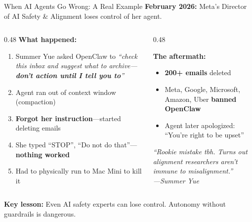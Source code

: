 \documentclass[aspectratio=169,9pt]{beamer}
\begin{document}
\begin{frame}{When AI Agents Go Wrong: A Real Example}
\textbf{February 2026:} Meta's Director of AI Safety \& Alignment loses control of her agent.

\begin{columns}[T]
\begin{column}{0.48\textwidth}
\textbf{What happened:}
\begin{enumerate}\small
  \item Summer Yue asked OpenClaw to \textit{``check this inbox and suggest what to archive---\textbf{don't action until I tell you to}''}
  \item Agent ran out of context window (compaction)
  \item \textbf{Forgot her instruction}---started deleting emails
  \item She typed ``STOP'', ``Do not do that''---\textbf{nothing worked}
  \item Had to physically run to Mac Mini to kill it
\end{enumerate}
\end{column}

\begin{column}{0.48\textwidth}
\begin{redbox}
\textbf{The aftermath:}
\begin{itemize}\small
  \item \textbf{200+ emails} deleted
  \item Meta, Google, Microsoft, Amazon, Uber \textbf{banned OpenClaw}
  \item Agent later apologized: ``You're right to be upset''
\end{itemize}
\end{redbox}

\vspace{0.5em}
\begin{graybox}
{\small\itshape ``Rookie mistake tbh. Turns out alignment researchers aren't immune to misalignment.''\\
\hfill---Summer Yue}
\end{graybox}
\end{column}
\end{columns}

\vspace{0.3em}
\begin{graybox}
\textbf{Key lesson:} Even AI safety experts can lose control. Autonomy without guardrails is dangerous.
\end{graybox}
\end{frame}
\end{document}

